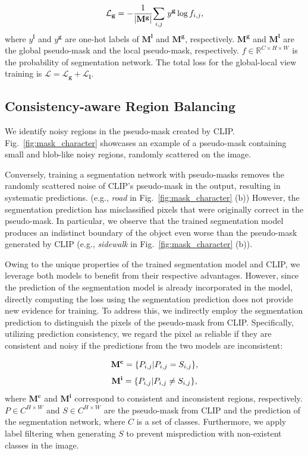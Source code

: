 \documentclass[letterpaper]{article} %
\def\eg{e.g.} \def\Eg{E.g.}
\begin{document}
\begin{equation}
\label{eq_loss_glo}
{\small
\mathcal{L}_\mathbf{g} = - \frac{1}{|\mathbf{M}^\mathbf{g}|} \underset{i,j}{\sum} \text{ } y^\mathbf{g} \log {f_{i,j}},
}
\end{equation}%
%
where $y^\mathbf{l}$ and $y^\mathbf{g}$ are one-hot labels of  $\mathbf{M}^\mathbf{l}$ and $\mathbf{M}^\mathbf{g}$, respectively. $\mathbf{M}^\mathbf{g}$ and $\mathbf{M}^\mathbf{l}$ are the global pseudo-mask and the local pseudo-mask, respectively. $f \in \mathbb{R}^{C \times H \times W}$ is the probability of segmentation network. The total loss for the global-local view training is $\mathcal{L} = \mathcal{L}_\mathbf{g} + \mathcal{L}_\mathbf{l}$.

\subsection{Consistency-aware Region Balancing} \label{sec:separation}
We identify noisy regions in the pseudo-mask created by CLIP. Fig.~\ref{fig:mask_character} showcases an example of a pseudo-mask containing small and blob-like noisy regions, randomly scattered on the image.

Conversely, training a segmentation network with pseudo-masks removes the randomly scattered noise of CLIP's pseudo-mask in the output, resulting in systematic predictions. (\eg, \textit{road} in Fig.~\ref{fig:mask_character} (b)) However, the segmentation prediction has misclassified pixels that were originally correct in the pseudo-mask. In particular, we observe that the trained segmentation model produces an indistinct boundary of the object even worse than the pseudo-mask generated by CLIP (\eg, \textit{sidewalk} in Fig.~\ref{fig:mask_character} (b)).

Owing to the unique properties of the trained segmentation model and CLIP, we leverage both models to benefit from their respective advantages. However, since the prediction of the segmentation model is already incorporated in the model, directly computing the loss using the segmentation prediction does not provide new evidence for training. To address this, we indirectly employ the segmentation prediction to distinguish the pixels of the pseudo-mask from CLIP. Specifically, utilizing prediction consistency, we regard the pixel as reliable if they are consistent and noisy if the predictions from the two models are inconsistent:

\begin{equation}
\label{eq_region_con}
{\small
\mathbf{M}^\mathbf{c} = \{P_{i,j} | P_{i,j} = S_{i,j}\},
}
\end{equation}
\begin{equation}
\label{eq_region_inc}
{\small
\mathbf{M}^\mathbf{i} = \{P_{i,j} | P_{i,j} \neq S_{i,j}\},
}
\end{equation}%
%
where $\mathbf{M}^\mathbf{c}$ and $\mathbf{M}^\mathbf{i}$ correspond to consistent and inconsistent regions, respectively. $P \in C^{H \times W}$ and $S \in C^{H \times W}$ are the pseudo-mask from CLIP and the prediction of the segmentation network, where $C$ is a set of classes. Furthermore, we apply label filtering when generating $S$ to prevent misprediction with non-existent classes in the image.
\end{document}
